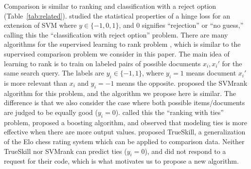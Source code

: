 \documentclass{article}
\newcommand{\RR}{\mathbb R}
\begin{document}
Comparison is similar to ranking and classification with a reject
option (Table~\ref{tab:related}).  \citet{reject-option} studied the
statistical properties of a hinge loss for an extension of SVM where
$y\in\{-1,0,1\}$, and 0 signifies ``rejection'' or ``no guess,''
calling this the ``classification with reject option'' problem.  There
are many algorithms for the supervised learning to rank problem
\citep{learning-to-rank}, which is similar to the supervised
comparison problem we consider in this paper. The main idea of
learning to rank is to train on labeled pairs of possible documents
$x_i,x_i'$ for the same search query. The labels are $y_i\in\{-1,1\}$,
where $y_i=1$ means document $x_i'$ is more relevant than $x_i$ and
$y_i=-1$ means the opposite. \citet{ranksvm} proposed the SVMrank
algorithm for this problem, and the algorithm we propose here is
similar. The difference is that we also consider the case where both
possible items/documents are judged to be equally good ($y_i=0$).
\citet{rank-with-ties} called this the ``ranking with ties'' problem,
proposed a boosting algorithm, and observed that modeling ties is more
effective when there are more output values. \citet{trueskill}
proposed TrueSkill, a generalization of the Elo chess rating system
which can be applied to comparison data. Neither TrueSkill nor SVMrank
can predict ties ($y_i=0$), and \citet{rank-with-ties} did not respond
to a request for their code, which is what motivates us to propose a
new algorithm.

%   

\end{document}
